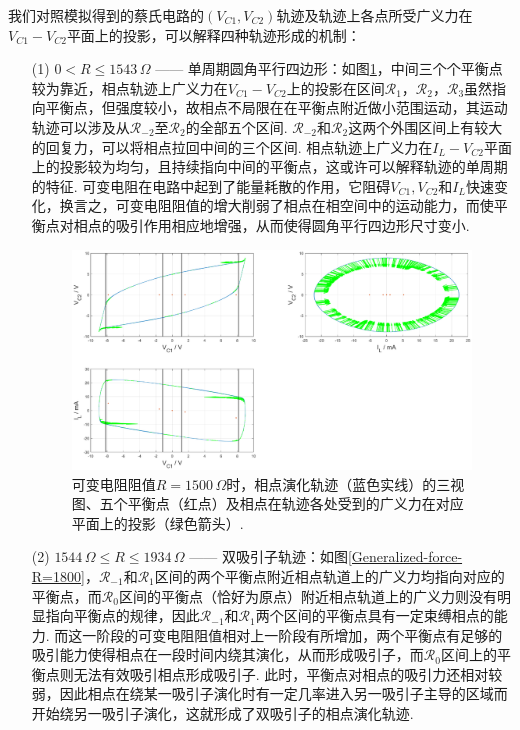 \documentclass[a4paper, 10pt]{article}
\begin{document}
\begin{multicols*}{2}
我们对照模拟得到的蔡氏电路的$(V_{C1},V_{C2})$轨迹及轨迹上各点所受广义力在$V_{C1}-V_{C2}$平面上的投影，可以解释四种轨迹形成的机制：
\begin{itemize}
    \item[(1)] $0<R\leq 1543\,\Omega$ —— 单周期圆角平行四边形：如图\ref{Generalized-force-R=1500}，中间三个个平衡点较为靠近，相点轨迹上广义力在$V_{C1}-V_{C2}$上的投影在区间$\mathcal{R}_1$，$\mathcal{R}_2$，$\mathcal{R}_3$虽然指向平衡点，但强度较小，故相点不局限在在平衡点附近做小范围运动，其运动轨迹可以涉及从$\mathcal{R}_{-2}$至$\mathcal{R}_2$的全部五个区间. $\mathcal{R}_{-2}$和$\mathcal{R}_2$这两个外围区间上有较大的回复力，可以将相点拉回中间的三个区间. 相点轨迹上广义力在$I_L-V_{C2}$平面上的投影较为均匀，且持续指向中间的平衡点，这或许可以解释轨迹的单周期的特征. 可变电阻在电路中起到了能量耗散的作用，它阻碍$V_{C1},V_{C2}$和$I_L$快速变化，换言之，可变电阻阻值的增大削弱了相点在相空间中的运动能力，而使平衡点对相点的吸引作用相应地增强，从而使得圆角平行四边形尺寸变小.
    \begin{figure}[H]
        \centering
        \includegraphics[width=\columnwidth]{Generalized-force-R=1500.eps}
        \caption{可变电阻阻值$R=1500\,\Omega$时，相点演化轨迹（蓝色实线）的三视图、五个平衡点（红点）及相点在轨迹各处受到的广义力在对应平面上的投影（绿色箭头）.}
        \label{Generalized-force-R=1500}
    \end{figure}
    \item[(2)] $1544\,\Omega\leq R\leq 1934\,\Omega$ —— 双吸引子轨迹：如图\ref{Generalized-force-R=1800}，$\mathcal{R}_{-1}$和$\mathcal{R}_1$区间的两个平衡点附近相点轨道上的广义力均指向对应的平衡点，而$\mathcal{R}_0$区间的平衡点（恰好为原点）附近相点轨道上的广义力则没有明显指向平衡点的规律，因此$\mathcal{R}_{-1}$和$\mathcal{R}_1$两个区间的平衡点具有一定束缚相点的能力. 而这一阶段的可变电阻阻值相对上一阶段有所增加，两个平衡点有足够的吸引能力使得相点在一段时间内绕其演化，从而形成吸引子，而$\mathcal{R}_0$区间上的平衡点则无法有效吸引相点形成吸引子. 此时，平衡点对相点的吸引力还相对较弱，因此相点在绕某一吸引子演化时有一定几率进入另一吸引子主导的区域而开始绕另一吸引子演化，这就形成了双吸引子的相点演化轨迹.

\end{itemize}
\end{multicols*}
\end{document}
